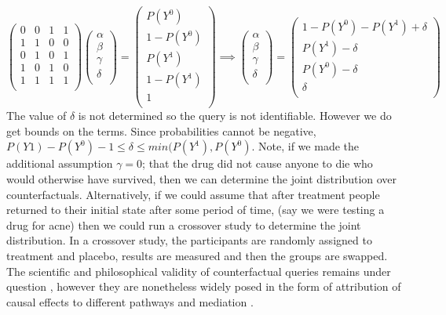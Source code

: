 \documentclass[11pt,a4paper,oneside]{book}
\theoremstyle{plain}
\theoremstyle{definition}
\begin{document}
\begin{equation}
\left(
\begin{array}{cccc}
0&0&1&1\\
1&1&0&0\\
0&1&0&1\\
1&0&1&0\\
1&1&1&1\\
\end{array}
\right)
\left(
\begin{array}{c}
\alpha\\
\beta\\
\gamma\\
\delta\\
\end{array}
\right)= 
\left(
\begin{array}{c}
P(Y^{0})\\
1-P(Y^{0})\\
P(Y^{1})\\
1-P(Y^{1})\\
1\\
\end{array}
\right)
\implies
\left(
\begin{array}{c}
\alpha\\
\beta\\
\gamma\\
\delta\\
\end{array}
\right)=
\left(
\begin{array}{c}
1-P(Y^{0})-P(Y^{1})+\delta\\
P(Y^{1})-\delta\\
P(Y^{0})-\delta\\
\delta\\
\end{array}
\right)
\end{equation}
The value of $\delta$ is not determined so the query is not identifiable. However we do get bounds on the terms. Since probabilities cannot be negative, $P(Y{1})-P(Y^{0})-1 \leq \delta \leq min(P(Y^{1}),P(Y^{0})$. Note, if we made the additional assumption $\gamma=0$; that the drug did not cause anyone to die who would otherwise have survived, then we can determine the joint distribution over counterfactuals. Alternatively, if we could assume that after treatment people returned to their initial state after some period of time, (say we were testing a drug for acne) then we could run a crossover study to determine the joint distribution. In a crossover study, the participants are randomly assigned to treatment and placebo, results are measured and then the groups are swapped. The scientific and philosophical validity of counterfactual queries remains under question \cite{Dawid2000,Dawid2014}, however they are nonetheless widely posed in the form of attribution of causal effects to different pathways and mediation \cite{Pearl2014,Imai2010a,VanderWeele2011}. 
\end{document}
